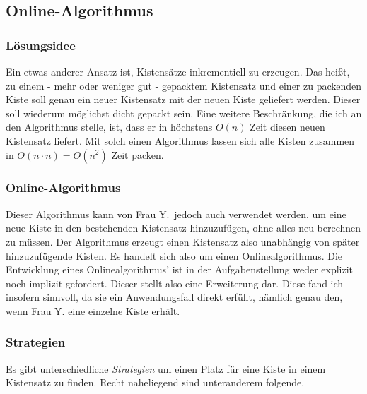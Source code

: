 \subsection{Online-Algorithmus}
\subsubsection{Lösungsidee}
 Ein etwas anderer Ansatz ist, Kistensätze inkrementiell zu erzeugen.
 Das heißt, zu einem - mehr oder weniger gut - gepacktem Kistensatz und einer zu packenden Kiste soll genau ein neuer Kistensatz mit der neuen Kiste geliefert werden.
 Dieser soll wiederum möglichst dicht gepackt sein.
 Eine weitere Beschränkung, die ich an den Algorithmus stelle, ist, dass er in höchstens $O(n)$ Zeit diesen neuen Kistensatz liefert.
 Mit solch einen Algorithmus lassen sich alle Kisten zusammen in $O(n \cdot n)=O(n^2)$ Zeit packen.
\subsubsection{Online-Algorithmus}
 Dieser Algorithmus kann von Frau Y.\ jedoch auch verwendet werden,
  um eine neue Kiste in den bestehenden Kistensatz hinzuzufügen, ohne alles neu berechnen zu müssen.
 Der Algorithmus erzeugt einen Kistensatz also unabhängig von später hinzuzufügende Kisten.
 Es handelt sich also um einen Onlinealgorithmus. Die Entwicklung eines Onlinealgorithmus' ist in der Aufgabenstellung weder explizit noch implizit gefordert.
 Dieser stellt also eine Erweiterung dar.
 Diese fand ich insofern sinnvoll, da sie ein Anwendungsfall direkt erfüllt, nämlich genau den, wenn Frau Y. eine einzelne Kiste erhält.
\lstset{basicstyle=\ttfamily}
\subsubsection{Strategien}
\label{strats}
 Es gibt unterschiedliche \emph{Strategien} um einen Platz für eine Kiste in einem Kistensatz zu finden.
 Recht naheliegend sind unteranderem folgende.\\

